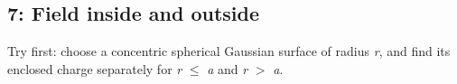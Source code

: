 \documentclass[11pt]{article}
\begin{document}
\begin{keepsection}
\begin{keepsection}
\subsection{7: Field inside and outside}

Try first: choose a concentric spherical Gaussian surface of radius \textit{r}, and find its enclosed charge separately for \textit{r} \ensuremath{\leq} \textit{a} and \textit{r} \ensuremath{>} \textit{a}.

\end{keepsection}
\end{keepsection}
\end{document}
